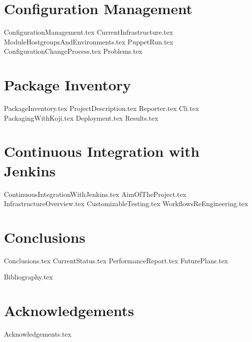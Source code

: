\documentclass[12pt,a4paper,openright]{report}
\begin{document}
\chapter{Configuration Management}

{ConfigurationManagement.tex}
{CurrentInfrastructure.tex}
{ModuleHostgroupsAndEnvironments.tex}
{PuppetRun.tex}
{ConfigurationChangeProcess.tex}
{Problems.tex}

\chapter{Package Inventory}

{PackageInventory.tex}
{ProjectDescription.tex}
{Reporter.tex}
{Cli.tex}
{PackagingWithKoji.tex}
{Deployment.tex}
{Results.tex}

\chapter{Continuous Integration with Jenkins}

{ContinuousIntegrationWithJenkins.tex}
{AimOfTheProject.tex}
{InfrastructureOverview.tex}
{CustomizableTesting.tex}
{WorkflowsReEngineering.tex}

\chapter{Conclusions}

{Conclusions.tex}
{CurrentStatus.tex}
{PerformanceReport.tex}
{FuturePlans.tex}


{Bibliography.tex}

\clearpage{\pagestyle{empty}\cleardoublepage}

\chapter*{Acknowledgements}

{Acknowledgements.tex}

\newpage\null\thispagestyle{empty}\newpage
\end{document}
